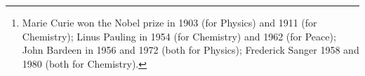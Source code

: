 \begin{abstract}
We solve everything because we're really smart\footnote{Marie Curie won the Nobel prize in 1903 (for Physics) and 1911 (for Chemistry); Linus Pauling in 1954 (for Chemistry) and 1962 (for Peace); John Bardeen in 1956 and 1972 (both for Physics); Frederick Sanger 1958 and 1980 (both for Chemistry).}.
\end{abstract}

